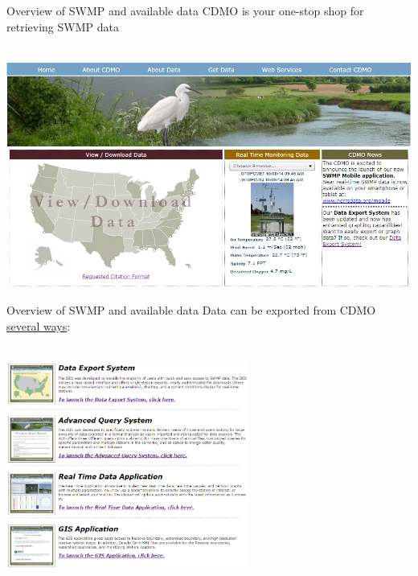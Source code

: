 \documentclass[xcolor=svgnames]{beamer}\usepackage[]{graphicx}\usepackage[]{color}
\begin{document}
\begin{frame}[t]{Overview of SWMP and available data}
CDMO is your one-stop shop for retrieving SWMP data \\~\\
\centerline{\includegraphics[width = \textwidth]{cdmo_front.png}}
\end{frame}

\begin{frame}{Overview of SWMP and available data}
Data can be exported from CDMO \href{http://cdmo.baruch.sc.edu/get/landing.cfm}{several ways}:\\~\\
\centerline{\includegraphics[width = 0.6\textwidth]{get_data.png}}
\end{frame}
\end{document}
